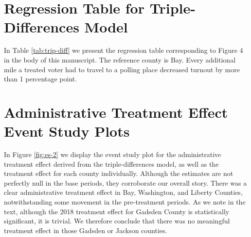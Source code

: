 \documentclass[
  12pt,
]{article}
\begin{document}
\hypertarget{regression-table-for-triple-differences-model}{%
\section*{Regression Table for Triple-Differences Model}\label{regression-table-for-triple-differences-model}}

In Table \ref{tab:trip-diff} we present the regression table corresponding to Figure 4 in the body of this manuscript. The reference county is Bay. Every additional mile a treated voter had to travel to a polling place decreased turnout by more than 1 percentage point.

\newpage
\begin{landscape}
\begin{singlespace}

\end{singlespace}
\end{landscape}

\hypertarget{administrative-treatment-effect-event-study-plots}{%
\section*{Administrative Treatment Effect Event Study Plots}\label{administrative-treatment-effect-event-study-plots}}

In Figure \ref{fig:es-2} we display the event study plot for the administrative treatment effect derived from the triple-differences model, as well as the treatment effect for each county individually. Although the estimates are not perfectly null in the base periods, they corroborate our overall story. There was a clear administrative treatment effect in Bay, Washington, and Liberty Counties, notwithstanding some movement in the pre-treatment periods. As we note in the text, although the 2018 treatment effect for Gadsden County is statistically significant, it is trivial. We therefore conclude that there was no meaningful treatment effect in those Gadsden or Jackson counties.
\end{document}
